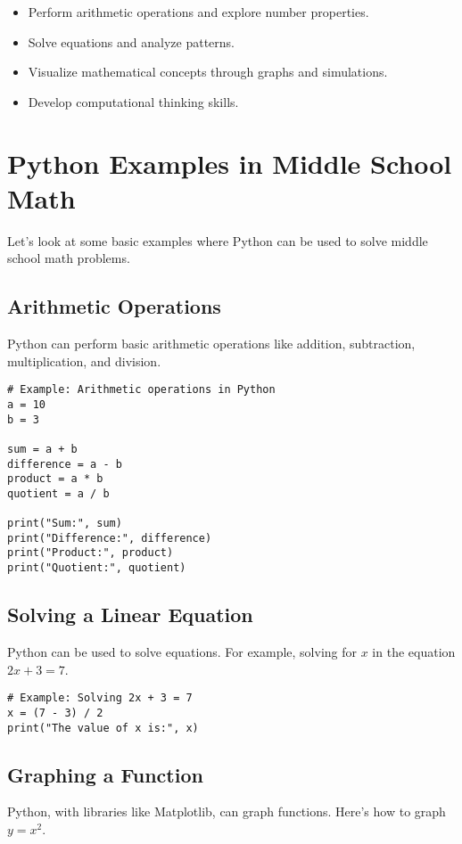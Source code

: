 \documentclass{book}
\begin{document}
\begin{itemize}
    \item Perform arithmetic operations and explore number properties.
    \item Solve equations and analyze patterns.
    \item Visualize mathematical concepts through graphs and simulations.
    \item Develop computational thinking skills.
\end{itemize}

\section{Python Examples in Middle School Math}
Let's look at some basic examples where Python can be used to solve middle school math problems.

\subsection{Arithmetic Operations}
Python can perform basic arithmetic operations like addition, subtraction, multiplication, and division.

\begin{lstlisting}[style=pythonstyle]
# Example: Arithmetic operations in Python
a = 10
b = 3

sum = a + b
difference = a - b
product = a * b
quotient = a / b

print("Sum:", sum)
print("Difference:", difference)
print("Product:", product)
print("Quotient:", quotient)
\end{lstlisting}

\subsection{Solving a Linear Equation}
Python can be used to solve equations. For example, solving for \(x\) in the equation \(2x + 3 = 7\).

\begin{lstlisting}[style=pythonstyle]
# Example: Solving 2x + 3 = 7
x = (7 - 3) / 2
print("The value of x is:", x)
\end{lstlisting}

\subsection{Graphing a Function}
Python, with libraries like Matplotlib, can graph functions. Here's how to graph \(y = x^2\).
\end{document}
